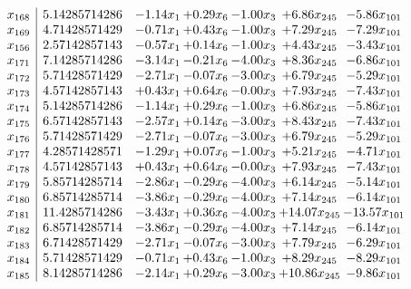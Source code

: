 \documentclass[8pt]{article}
\begin{document}
\[\begin{array}{c| c c@{\hskip 2pt} c@{\hskip 2pt} c@{\hskip 2pt} c@{\hskip 2pt} c@{\hskip 2pt} }
 x_{168}   &  5.14285714286 & -1.14 x_{1} & +  0.29 x_{6} & -1.00 x_{3} & +  6.86 x_{245} & -5.86 x_{101}\\
 x_{169}   &  4.71428571429 & -0.71 x_{1} & +  0.43 x_{6} & -1.00 x_{3} & +  7.29 x_{245} & -7.29 x_{101}\\
 x_{156}   &  2.57142857143 & -0.57 x_{1} & +  0.14 x_{6} & -1.00 x_{3} & +  4.43 x_{245} & -3.43 x_{101}\\
 x_{171}   &  7.14285714286 & -3.14 x_{1} & -0.21 x_{6} & -4.00 x_{3} & +  8.36 x_{245} & -6.86 x_{101}\\
 x_{172}   &  5.71428571429 & -2.71 x_{1} & -0.07 x_{6} & -3.00 x_{3} & +  6.79 x_{245} & -5.29 x_{101}\\
 x_{173}   &  4.57142857143 & +  0.43 x_{1} & +  0.64 x_{6} & -0.00 x_{3} & +  7.93 x_{245} & -7.43 x_{101}\\
 x_{174}   &  5.14285714286 & -1.14 x_{1} & +  0.29 x_{6} & -1.00 x_{3} & +  6.86 x_{245} & -5.86 x_{101}\\
 x_{175}   &  6.57142857143 & -2.57 x_{1} & +  0.14 x_{6} & -3.00 x_{3} & +  8.43 x_{245} & -7.43 x_{101}\\
 x_{176}   &  5.71428571429 & -2.71 x_{1} & -0.07 x_{6} & -3.00 x_{3} & +  6.79 x_{245} & -5.29 x_{101}\\
 x_{177}   &  4.28571428571 & -1.29 x_{1} & +  0.07 x_{6} & -1.00 x_{3} & +  5.21 x_{245} & -4.71 x_{101}\\
 x_{178}   &  4.57142857143 & +  0.43 x_{1} & +  0.64 x_{6} & -0.00 x_{3} & +  7.93 x_{245} & -7.43 x_{101}\\
 x_{179}   &  5.85714285714 & -2.86 x_{1} & -0.29 x_{6} & -4.00 x_{3} & +  6.14 x_{245} & -5.14 x_{101}\\
 x_{180}   &  6.85714285714 & -3.86 x_{1} & -0.29 x_{6} & -4.00 x_{3} & +  7.14 x_{245} & -6.14 x_{101}\\
 x_{181}   &  11.4285714286 & -3.43 x_{1} & +  0.36 x_{6} & -4.00 x_{3} & + 14.07 x_{245} & -13.57 x_{101}\\
 x_{182}   &  6.85714285714 & -3.86 x_{1} & -0.29 x_{6} & -4.00 x_{3} & +  7.14 x_{245} & -6.14 x_{101}\\
 x_{183}   &  6.71428571429 & -2.71 x_{1} & -0.07 x_{6} & -3.00 x_{3} & +  7.79 x_{245} & -6.29 x_{101}\\
 x_{184}   &  5.71428571429 & -0.71 x_{1} & +  0.43 x_{6} & -1.00 x_{3} & +  8.29 x_{245} & -8.29 x_{101}\\
 x_{185}   &  8.14285714286 & -2.14 x_{1} & +  0.29 x_{6} & -3.00 x_{3} & + 10.86 x_{245} & -9.86 x_{101}\\

\end{array}\]
\end{document}
